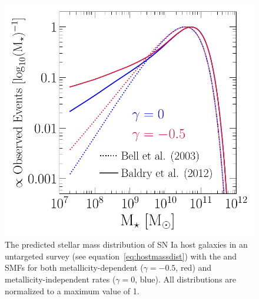 \documentclass[ms.tex]{subfiles}
\begin{document}
\begin{figure}
\centering
\includegraphics[scale = 0.55]{ia_massdist.pdf}
\caption{
The predicted stellar mass distribution of SN Ia host galaxies in an
untargeted survey (see equation~\ref{eq:hostmassdist}) with the
\citet[][dotted]{Bell2003} and~\citet[][solid]{Baldry2012} SMFs for both
metallicity-dependent ($\gamma = -0.5$, red) and metallicity-independent rates
($\gamma = 0$, blue).
All distributions are normalized to a maximum value of 1.
}
\label{fig:hostmassdist}
\end{figure}
\end{document}
